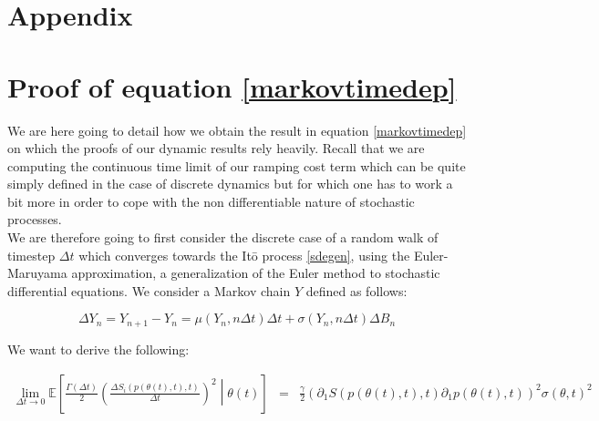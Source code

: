 %
%
\newpage
\begin{subappendices}
\section*{Appendix}

\section{Proof of equation \ref{markovtimedep}}\label{stochasticdyn_proof}
We are here going to detail how we obtain the result in equation \ref{markovtimedep} on which the proofs of our dynamic results rely heavily. Recall that we are computing the continuous time limit of our ramping cost term which can be quite simply defined in the case of discrete dynamics but for which one has to work a bit more in order to cope with the non differentiable nature of stochastic processes. \\

We are therefore going to first consider the discrete case of a random walk of timestep $\Delta t$ which converges towards the It\={o} process \ref{sdegen}, using the Euler-Maruyama approximation, a generalization of the Euler method to stochastic differential equations. We consider a Markov chain $Y$ defined as follows: 

\begin{equation}
\Delta Y_n=Y_{n+1}-Y_n= \mu(Y_n,n \Delta t)\Delta t+\sigma (Y_n,n \Delta t)\Delta B_n
\end{equation}


We want to derive the following: 
\begin{footnotesize}
\begin{eqnarray}
\lim_{\Delta t \to 0}\mathbb{E}\left[\frac{\Gamma(\Delta t)}{2}\left(\frac{\Delta S_i(p(\theta(t),t),t)}{\Delta t}\right)^2\middle \vert \theta(t)  \right] &=& \frac{\gamma}{2} (\partial_1S(p(\theta(t),t),t)\partial_1p(\theta(t),t))^2 \sigma(\theta,t)^2
\end{eqnarray}
\end{footnotesize}


\end{subappendices}
